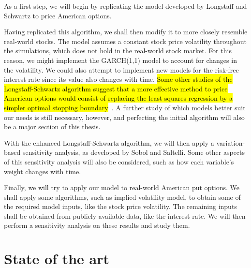 \documentclass[a4paper,twocolumn,aps,prd,longbibliography,superscriptaddress]{revtex4-1}
\begin{document}
As a first step, we will begin by replicating the model developed by Longstaff and Schwartz to price American options.

Having replicated this algorithm, we shall then modify it to more closely resemble real-world stocks.
The model assumes a constant stock price volatility throughout the simulations, which does not hold in the real-world stock market. For this reason, we might implement the GARCH(1,1) model to account for changes in the volatility.
We could also attempt to implement new models for the risk-free interest rate since its value also changes with time.
\hl{Some other studies of the Longstaff-Schwartz algorithm suggest that a more effective method to price American options would consist of replacing the least squares regression by a simpler optimal stopping boundary}~\cite{Andersen}.
A further study of which models better suit our needs is still necessary, however, and perfecting the initial algorithm will also be a major section of this thesis.

With the enhanced Longstaff-Schwartz algorithm, we will then apply a variation-based sensitivity analysis, as developed by Sobol and Saltelli.
Some other aspects of this sensitivity analysis will also be considered, such as how each variable's weight changes with time.

Finally, we will try to apply our model to real-world American put options.
We shall apply some algorithms, such as implied volatility model, to obtain some of the required model inputs, like the stock price volatility. The remaining inputs shall be obtained from publicly available data, like the interest rate.
We will then perform a sensitivity analysis on these results and study them.


\section{State of the art}
\end{document}
